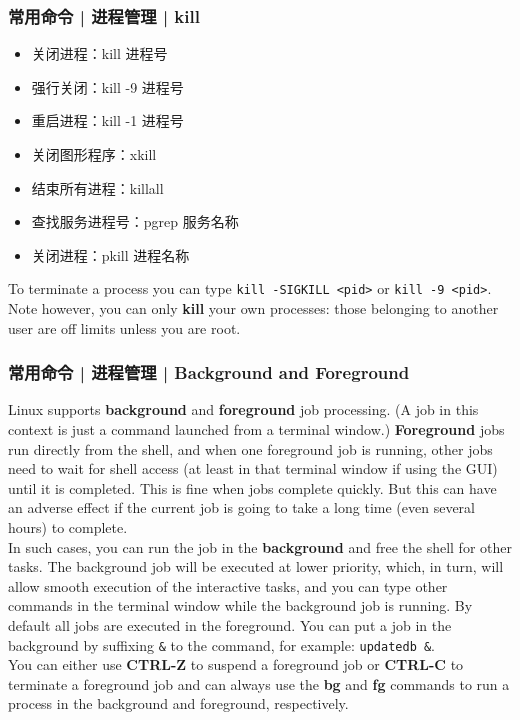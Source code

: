 \begin{frame}[fragile]
  \frametitle{常用命令 | 进程管理 | kill}
  \begin{itemize}
    \item 关闭进程：kill 进程号
    \item 强行关闭：kill -9 进程号
    \item 重启进程：kill -1 进程号
    \item 关闭图形程序：xkill
    \item 结束所有进程：killall
    \item 查找服务进程号：pgrep 服务名称
    \item 关闭进程：pkill 进程名称
  \end{itemize}
  To terminate a process you can type \verb|kill -SIGKILL <pid>| or \verb|kill -9 <pid>|. Note however, you can only \textbf{kill} your own processes: those belonging to another user are off limits unless you are root.
\end{frame}

\begin{frame}[fragile]
  \frametitle{常用命令 | 进程管理 | Background and Foreground}
  {\footnotesize
  Linux supports \textbf{background} and \textbf{foreground} job processing. (A job in this context is just a command launched from a terminal window.) \textbf{Foreground} jobs run directly from the shell, and when one foreground job is running, other jobs need to wait for shell access (at least in that terminal window if using the GUI) until it is completed. This is fine when jobs complete quickly. But this can have an adverse effect if the current job is going to take a long time (even several hours) to complete.\\
  \vspace{0.2cm}
  In such cases, you can run the job in the \textbf{background} and free the shell for other tasks. The background job will be executed at lower priority, which, in turn, will allow smooth execution of the interactive tasks, and you can type other commands in the terminal window while the background job is running. By default all jobs are executed in the foreground. You can put a job in the background by suffixing \verb|&| to the command, for example: \verb|updatedb &|.\\
  \vspace{0.2cm}
  You can either use \textbf{CTRL-Z} to suspend a foreground job or \textbf{CTRL-C} to terminate a foreground job and can always use the \textbf{bg} and \textbf{fg} commands to run a process in the background and foreground, respectively.\\
  } 
\end{frame}

